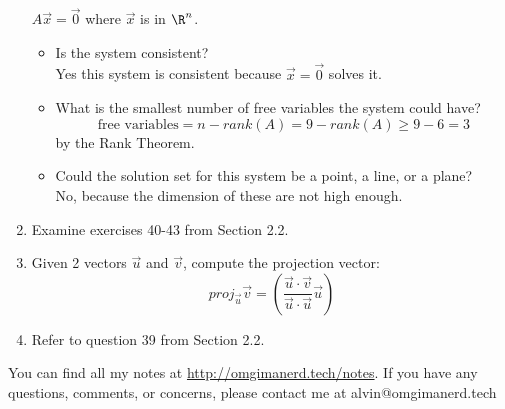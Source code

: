 \documentclass[letterpaper, 12pt]{math}
\begin{document}
\begin{enumerate}
    \( A\vec{x} = \vec{0} \) where \( \vec{x} \) is in \( \R^n \).
    \begin{itemize}
      \item Is the system consistent? \\
        Yes this system is consistent because \( \vec{x} = \vec{0} \) solves it.
      \item What is the smallest number of free variables the system could have?
        \[ \text{free variables} = n-rank(A) = 9-rank(A) \ge 9-6 = 3 \]
        by the Rank Theorem.
      \item Could the solution set for this system be a point, a line, or a
        plane? \\
        No, because the dimension of these are not high enough.
    \end{itemize}
  \item Examine exercises 40-43 from Section 2.2.
  \item Given 2 vectors \( \vec{u} \) and \( \vec{v} \), compute the projection
    vector:
    \[ proj_{\vec{u}}\vec{v} =
      (\frac{\vec{u}\cdot\vec{v}}{\vec{u}\cdot\vec{u}}\vec{u}) \]
  \item Refer to question 39 from Section 2.2.
\end{enumerate}

\begin{center}
  You can find all my notes at \url{http://omgimanerd.tech/notes}. If you have
  any questions, comments, or concerns, please contact me at
  alvin@omgimanerd.tech
\end{center}
\end{document}
